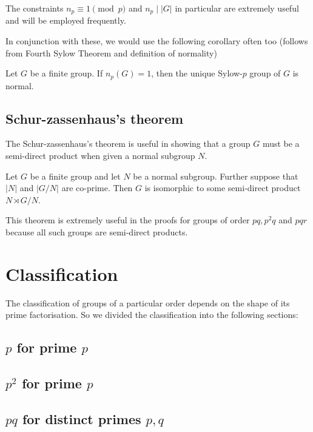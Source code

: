 \documentclass[a4paper,11pt, titlepage]{article}
\theoremstyle{remark}
\begin{document}
The constraints $n_p \equiv 1 \pmod p$ and $n_p \mid |G|$ in particular are extremely useful and will be employed frequently.

In conjunction with these, we would use the following corollary often too (follows from Fourth Sylow Theorem and definition of normality)
\begin{corollary}
    Let $G$ be a finite group. If $n_p(G) = 1$, then the unique Sylow-$p$ group of $G$ is normal.
\end{corollary}

\subsection{Schur-zassenhaus's theorem}

The Schur-zassenhaus's theorem is useful in showing that a group $G$ must be a semi-direct product when given a normal subgroup $N$.

\begin{theorem}
    Let $G$ be a finite group and let $N$ be a normal subgroup. Further suppose that $|N|$ and $|G/N|$ are co-prime. Then $G$ is isomorphic to some semi-direct product $N \rtimes G/N$.
\end{theorem}

This theorem is extremely useful in the proofs for groups of order $pq, p^2 q$ and $pqr$ because all such groups are semi-direct products.

\section{Classification}

The classification of groups of a particular order depends on the shape of its prime factorisation. So we divided the classification into the following sections:

\subsection{$p$ for prime $p$}
\label{$p$ for prime $p$}

\subsection{$p^2$ for prime $p$}
\label{$p^2$ for prime $p$}

\subsection{$pq$ for distinct primes $p, q$}
\label{$pq$ for distinct primes $p, q$}
\end{document}
